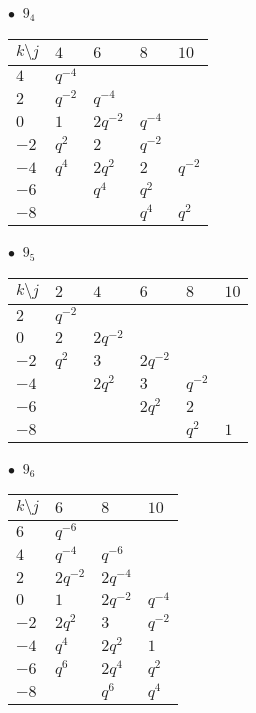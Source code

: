 %
\begin{minipage}{\linewidth}
$\bullet\ $ $9_{4}$ \vspace{0.5em} \\
\begin{tabular}{l|llll}
$k \setminus j$ & $4$ & $6$ & $8$ & $10$ \\
\hline
$4$ & $q^{-4}$ &  &  &  \\
$2$ & $q^{-2}$ & $q^{-4}$ &  &  \\
$0$ & $1$ & $2q^{-2}$ & $q^{-4}$ &  \\
$-2$ & $q^{2}$ & $2$ & $q^{-2}$ &  \\
$-4$ & $q^{4}$ & $2q^{2}$ & $2$ & $q^{-2}$ \\
$-6$ &  & $q^{4}$ & $q^{2}$ &  \\
$-8$ &  &  & $q^{4}$ & $q^{2}$ \\
\end{tabular}
\vspace{2em}
\end{minipage}
%
\begin{minipage}{\linewidth}
$\bullet\ $ $9_{5}$ \vspace{0.5em} \\
\begin{tabular}{l|lllll}
$k \setminus j$ & $2$ & $4$ & $6$ & $8$ & $10$ \\
\hline
$2$ & $q^{-2}$ &  &  &  &  \\
$0$ & $2$ & $2q^{-2}$ &  &  &  \\
$-2$ & $q^{2}$ & $3$ & $2q^{-2}$ &  &  \\
$-4$ &  & $2q^{2}$ & $3$ & $q^{-2}$ &  \\
$-6$ &  &  & $2q^{2}$ & $2$ &  \\
$-8$ &  &  &  & $q^{2}$ & $1$ \\
\end{tabular}
\vspace{2em}
\end{minipage}
%
\begin{minipage}{\linewidth}
$\bullet\ $ $9_{6}$ \vspace{0.5em} \\
\begin{tabular}{l|lll}
$k \setminus j$ & $6$ & $8$ & $10$ \\
\hline
$6$ & $q^{-6}$ &  &  \\
$4$ & $q^{-4}$ & $q^{-6}$ &  \\
$2$ & $2q^{-2}$ & $2q^{-4}$ &  \\
$0$ & $1$ & $2q^{-2}$ & $q^{-4}$ \\
$-2$ & $2q^{2}$ & $3$ & $q^{-2}$ \\
$-4$ & $q^{4}$ & $2q^{2}$ & $1$ \\
$-6$ & $q^{6}$ & $2q^{4}$ & $q^{2}$ \\
$-8$ &  & $q^{6}$ & $q^{4}$ \\
\end{tabular}
\vspace{2em}
\end{minipage}

